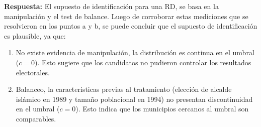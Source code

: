 \documentclass[
]{article}
\begin{document}
\textbf{Respuesta:} El supuesto de identificación para una RD, se basa
en la manipulación y el test de balance. Luego de corroborar estas
mediciones que se resolvieron en los puntos a y b, se puede concluir que
el supuesto de identificación es plausible, ya que:

\begin{enumerate}
\def\labelenumi{\arabic{enumi}.}
\item
  No existe evidencia de manipulación, la distribución es continua en el
  umbral (\(c=0\)). Esto sugiere que los candidatos no pudieron
  controlar los resultados electorales.
\item
  Balanceo, la caracteristicas previas al tratamiento (elección de
  alcalde islámico en 1989 y tamaño poblacional en 1994) no presentan
  discontinuidad en el umbral (\(c=0\)). Esto indica que los municipios
  cercanos al umbral son comparables.
\end{enumerate}
\end{document}
